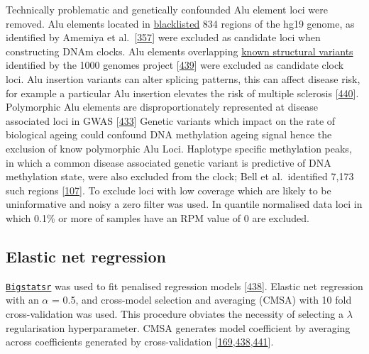 \documentclass[
]{book}
\begin{document}
Technically problematic and genetically confounded Alu element loci were removed.
Alu elements located in \href{https://github.com/Boyle-Lab/Blacklist/raw/master/lists/hg19-blacklist.v2.bed.gz}{blacklisted} 834 regions of the hg19 genome, as identified by Amemiya et al.~{[}\protect\hyperlink{ref-Amemiya2019}{357}{]} were excluded as candidate loci when constructing DNAm clocks.
Alu elements overlapping \href{ftp://ftp.1000genomes.ebi.ac.uk/vol1/ftp/phase3/integrated_sv_map/ALL.wgs.mergedSV.v8.20130502.svs.genotypes.vcf.gz}{known structural variants} identified by the 1000 genomes project {[}\protect\hyperlink{ref-Fairley2020}{439}{]} were excluded as candidate clock loci.
Alu insertion variants can alter splicing patterns, this can affect disease risk, for example a particular Alu insertion elevates the risk of multiple sclerosis {[}\protect\hyperlink{ref-Payer2019}{440}{]}.
Polymorphic Alu elements are disproportionately represented at disease associated loci in GWAS {[}\protect\hyperlink{ref-Payer2017}{433}{]}
Genetic variants which impact on the rate of biological ageing could confound DNA methylation ageing signal hence the exclusion of know polymorphic Alu Loci.
Haplotype specific methylation peaks, in which a common disease associated genetic variant is predictive of DNA methylation state, were also excluded from the clock; Bell et al.~identified 7,173 such regions {[}\protect\hyperlink{ref-Bell2017a}{107}{]}.
To exclude loci with low coverage which are likely to be uninformative and noisy a zero filter was used.
In quantile normalised data loci in which 0.1\% or more of samples have an RPM value of 0 are excluded.

\hypertarget{elastic-net-regression}{%
\subsection{Elastic net regression}\label{elastic-net-regression}}

\href{https://privefl.github.io/bigstatsr/}{\texttt{Bigstatsr}} was used to fit penalised regression models {[}\protect\hyperlink{ref-Prive2019}{438}{]}.
Elastic net regression with an \(\alpha\) = 0.5, and cross-model selection and averaging (CMSA) with 10 fold cross-validation was used.
This procedure obviates the necessity of selecting a \(\lambda\) regularisation hyperparameter.
CMSA generates model coefficient by averaging across coefficients generated by cross-validation {[}\protect\hyperlink{ref-Friedman2010}{169},\protect\hyperlink{ref-Prive2019}{438},\protect\hyperlink{ref-Tibshirani2012}{441}{]}.
\end{document}
